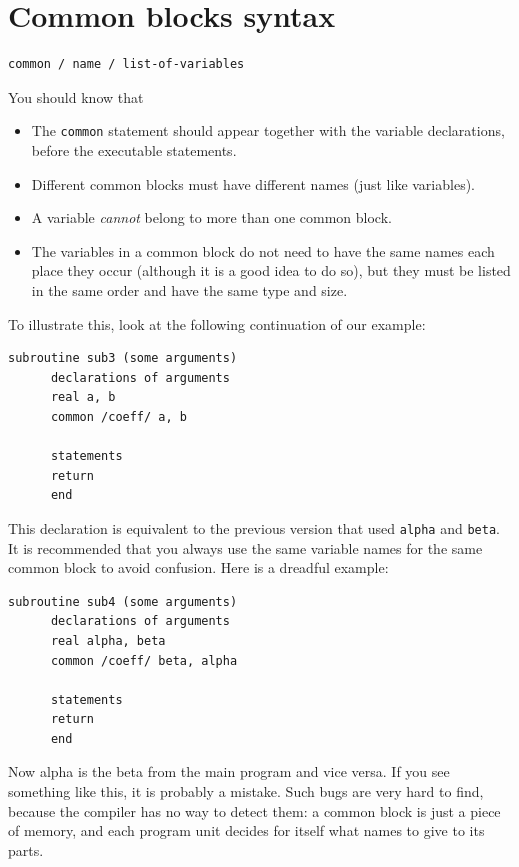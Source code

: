 \section{Common blocks syntax}

\begin{lstlisting}[style=fortran77]
      common / name / list-of-variables
\end{lstlisting}

You should know that

\begin{itemize}
    \item The \texttt{common} statement should appear together with the variable declarations, before the executable statements.
    \item Different common blocks must have different names (just like variables).
    \item A variable \emph{cannot} belong to more than one common block.
    \item The variables in a common block do not need to have the same names each place they occur (although it is a good idea to do so), but they must be listed in the same order and have the same type and size.
\end{itemize}

To illustrate this, look at the following continuation of our example:

\begin{lstlisting}[style=fortran77]
      subroutine sub3 (some arguments)
      declarations of arguments
      real a, b
      common /coeff/ a, b

      statements
      return
      end
\end{lstlisting}

This declaration is equivalent to the previous version that used \texttt{alpha} and \texttt{beta}. It is recommended that you always use the same variable names for the same common block to avoid confusion. Here is a dreadful example:

\begin{lstlisting}[style=fortran77]
      subroutine sub4 (some arguments)
      declarations of arguments
      real alpha, beta
      common /coeff/ beta, alpha

      statements
      return
      end
\end{lstlisting}

Now alpha is the beta from the main program and vice versa. If you see something like this, it is probably a mistake. Such bugs are very hard to find, because the compiler has no way to detect them: a common block is just a piece of memory, and each program unit decides for itself what names to give to its parts.

